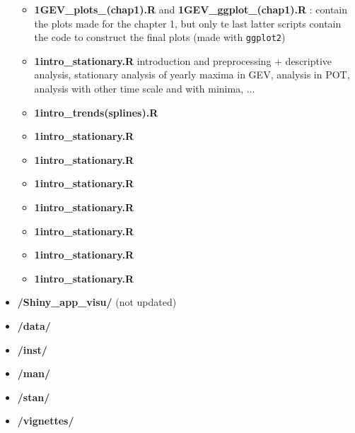 \documentclass[11pt,a4paper,openany ]{book}
\begin{document}
\begin{itemize}
\begin{itemize}
\item \textbf{1GEV\_plots\_(chap1).R} and \textbf{1GEV\_ggplot\_(chap1).R} : contain the plots made for the chapter 1, but only te last latter scripts contain the code to construct the final plots (made with \texttt{ggplot2})
\item\textbf{1intro\_stationary.R} introduction and preprocessing +  descriptive analysis, stationary analysis of yearly maxima in GEV, analysis in POT, analysis with other time scale and with minima, ...
\item\textbf{1intro\_trends(splines).R} 
\item\textbf{1intro\_stationary.R} 
\item\textbf{1intro\_stationary.R} 
\item\textbf{1intro\_stationary.R} 
\item\textbf{1intro\_stationary.R} 
\item\textbf{1intro\_stationary.R} 
\item\textbf{1intro\_stationary.R} 
\item\textbf{1intro\_stationary.R} 
\end{itemize}


\item \textbf{/Shiny\_app\_visu/} (not updated)
\item \textbf{/data/}
\item \textbf{/inst/}
\item \textbf{/man/}
\item \textbf{/stan/}
\item \textbf{/vignettes/}
\end{itemize}




\setlength{\parindent}{5em}
\setlength{\parskip}{2em}
\renewcommand{\baselinestretch}{4.0}


\end{document}
